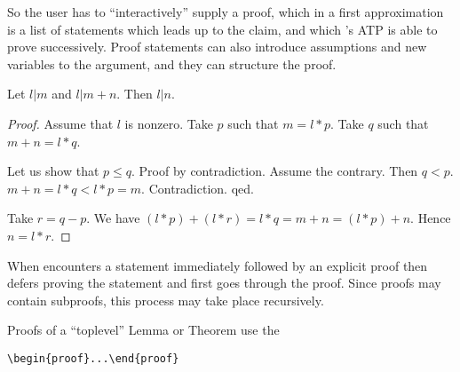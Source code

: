 \documentclass[11pt]{article}
\begin{document}
So the user has to ``interactively'' supply a proof, which in a first
approximation is a list
of statements which leads up to the claim, and which
\Naproche's ATP is able to prove successively.
Proof statements can also introduce assumptions
and new variables to the argument, and they can
structure the proof.

\begin{forthel}
\begin{lemma} Let $l | m$ and $l | m + n$. Then $l | n$.
\end{lemma}

\begin{proof}
Assume that $l$ is nonzero.
Take $p$ such that $m = l * p$.
Take $q$ such that $m + n = l * q$.

Let us show that
$p \leq q$.
Proof by contradiction.
Assume the contrary. Then $q < p$.
$m+n = l * q < l * p = m$.
Contradiction. qed.

Take $r = q - p$.
We have $(l * p) + (l * r) = l * q = m + n = (l * p) + n$.
Hence $n = l * r$.
\end{proof}

\end{forthel}

When \Naproche encounters a statement immediately followed by an
explicit proof
then \Naproche defers proving the statement and first goes through
the proof. Since proofs may contain subproofs, this process may
take place recursively.

Proofs of a ``toplevel'' Lemma or Theorem use the

\verb+\begin{proof}...\end{proof}+
\end{document}
